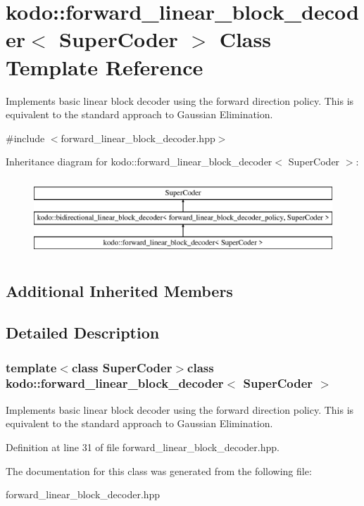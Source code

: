 \hypertarget{classkodo_1_1forward__linear__block__decoder}{\section{kodo\-:\-:forward\-\_\-linear\-\_\-block\-\_\-decoder$<$ Super\-Coder $>$ Class Template Reference}
\label{classkodo_1_1forward__linear__block__decoder}
}


Implements basic linear block decoder using the forward direction policy. This is equivalent to the standard approach to Gaussian Elimination.  




{\ttfamily \#include $<$forward\-\_\-linear\-\_\-block\-\_\-decoder.\-hpp$>$}

Inheritance diagram for kodo\-:\-:forward\-\_\-linear\-\_\-block\-\_\-decoder$<$ Super\-Coder $>$\-:\begin{figure}[H]
\begin{center}
\leavevmode
\includegraphics[height=2.952548cm]{classkodo_1_1forward__linear__block__decoder}
\end{center}
\end{figure}
\subsection*{Additional Inherited Members}


\subsection{Detailed Description}
\subsubsection*{template$<$class Super\-Coder$>$class kodo\-::forward\-\_\-linear\-\_\-block\-\_\-decoder$<$ Super\-Coder $>$}

Implements basic linear block decoder using the forward direction policy. This is equivalent to the standard approach to Gaussian Elimination. 

Definition at line 31 of file forward\-\_\-linear\-\_\-block\-\_\-decoder.\-hpp.



The documentation for this class was generated from the following file\-:\begin{DoxyCompactItemize}
\item 
forward\-\_\-linear\-\_\-block\-\_\-decoder.\-hpp\end{DoxyCompactItemize}
